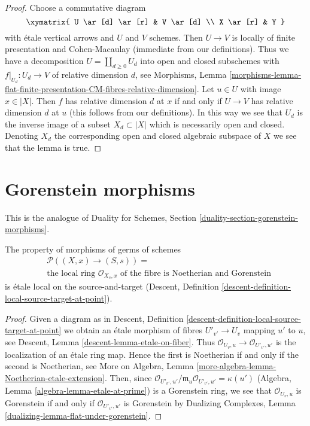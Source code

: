 \begin{proof}
Choose a commutative diagram
$$
\xymatrix{
U \ar[d] \ar[r] & V \ar[d] \\
X \ar[r] & Y
}
$$
with \'etale vertical arrows and $U$ and $V$ schemes.
Then $U \to V$ is locally of finite presentation and Cohen-Macaulay
(immediate from our definitions).
Thus we have a decomposition $U = \coprod_{d \geq 0} U_d$
into open and closed subschemes with $f|_{U_d} : U_d \to V$
of relative dimension $d$, see Morphisms, Lemma
\ref{morphisms-lemma-flat-finite-presentation-CM-fibres-relative-dimension}.
Let $u \in U$ with image $x \in |X|$. Then
$f$ has relative dimension $d$ at $x$ if and only if
$U \to V$ has relative dimension $d$ at $u$
(this follows from our definitions).
In this way we see that $U_d$ is the inverse image
of a subset $X_d \subset |X|$ which is necessarily
open and closed. Denoting $X_d$ the corresponding open
and closed algebraic subspace of $X$ we see that the lemma is true.
\end{proof}







\section{Gorenstein morphisms}
\label{section-gorenstein}

\noindent
This is the analogue of Duality for Schemes, Section
\ref{duality-section-gorenstein-morphisms}.

\begin{lemma}
\label{lemma-gorenstein-local-ring-fibre}
The property of morphisms of germs of schemes
\begin{align*}
& \mathcal{P}((X, x) \to (S, s)) = \\
& \text{the local ring }
\mathcal{O}_{X_s, x}
\text{ of the fibre is Noetherian and Gorenstein}
\end{align*}
is \'etale local on the source-and-target (Descent, Definition
\ref{descent-definition-local-source-target-at-point}).
\end{lemma}

\begin{proof}
Given a diagram as in
Descent, Definition \ref{descent-definition-local-source-target-at-point}
we obtain an \'etale morphism of fibres
$U'_{v'} \to U_v$ mapping $u'$ to $u$, see
Descent, Lemma \ref{descent-lemma-etale-on-fiber}.
Thus $\mathcal{O}_{U_v, u} \to \mathcal{O}_{U'_{v'}, u'}$
is the localization of an \'etale ring map. Hence
the first is Noetherian if and only if the second is Noetherian, see
More on Algebra, Lemma \ref{more-algebra-lemma-Noetherian-etale-extension}.
Then, since $\mathcal{O}_{U'_{v'}, u'}/\mathfrak m_u \mathcal{O}_{U'_{v'}, u'}
= \kappa(u')$ (Algebra, Lemma \ref{algebra-lemma-etale-at-prime})
is a Gorenstein ring, we see that
$\mathcal{O}_{U_v, u}$ is Gorenstein if and only if
$\mathcal{O}_{U'_{v'}, u'}$ is Gorenstein by
Dualizing Complexes, Lemma \ref{dualizing-lemma-flat-under-gorenstein}.
\end{proof}

